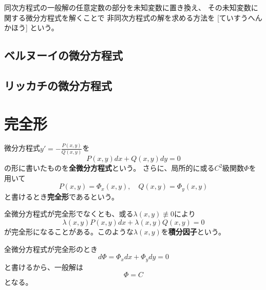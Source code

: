 \documentclass[report]{jlreq}
\begin{document}
同次方程式の一般解の任意定数の部分を未知変数に置き換え、
その未知変数に関する微分方程式を解くことで
非同次方程式の解を求める方法を
[ていすうへんかほう]
という。

\begin{example}[定数変化法]
    \TODO{}
\end{example}

\subsection{ベルヌーイの微分方程式}

\TODO{}

\subsection{リッカチの微分方程式}

\TODO{}




%
\section{完全形}

\begin{definition}[全微分方程式と完全形]
    微分方程式$y' = - \frac{P(x, y)}{Q(x, y)}$を
    \begin{equation}
        P(x, y) dx + Q(x, y) dy = 0
    \end{equation}
    の形に書いたものを\textbf{全微分方程式}という。
    さらに、局所的に或る$C^2$級関数$\Phi$を用いて
    \begin{equation}
        P(x, y) = \Phi_x (x, y),\quad
        Q(x, y) = \Phi_y (x, y)
    \end{equation}
    と書けるとき\textbf{完全形}であるという。
\end{definition}

\begin{definition}[積分因子]
    全微分方程式が完全形でなくとも、或る$\lambda(x, y) \not\equiv 0$により
    \begin{equation}
        \lambda(x, y) P(x, y) dx + \lambda(x, y) Q(x, y) = 0
    \end{equation}
    が完全形になることがある。このような$\lambda(x, y)$を\textbf{積分因子}という。
\end{definition}

全微分方程式が完全形のとき
\begin{equation}
    d\Phi = \Phi_x dx + \Phi_y dy = 0
\end{equation}
と書けるから、一般解は
\begin{equation}
    \Phi = C
\end{equation}
となる。
\end{document}

